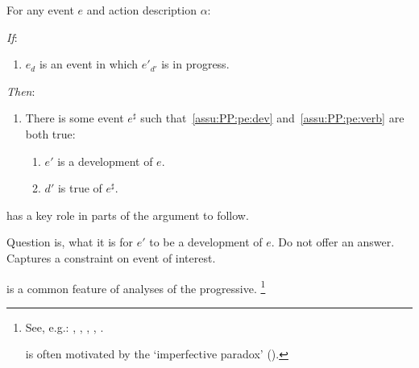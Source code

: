 \begin{note}
  \begin{assumption}[\assuPP{2}]%
    \label{assu:PP}%
    For any event \(e\) and action description \(\alpha\):
    \begin{itenum}
    \item[\emph{If}:]
      \begin{enumerate}[label=\alph*., ref=(\alph*)]
      \item
        \(e_{d}\) is an event in which \(e'_{d'}\) is in progress.
      \end{enumerate}
    \item[\emph{Then}:]
      \begin{enumerate}[label=\alph*., ref=(\alph*), resume]
      \item
        There is some  event \(e^{\sharp}\) such that~\ref{assu:PP:pe:dev} and~\ref{assu:PP:pe:verb} are both true:
        \begin{enumerate}[label=\roman*., ref=(\roman*)]
        \item
          \label{assu:PP:pe:dev}
          \(e'\) is a development of \(e\).
        \item
          \label{assu:PP:pe:verb}
          \(d'\) is true of \(e^{\sharp}\).
        \end{enumerate}
      \end{enumerate}
    \end{itenum}
    \vspace{-\baselineskip}
  \end{assumption}

  \assuPP{} has a key role in parts of the argument to follow.

  Question is, what it is for \(e'\) to be a development of \(e\).
  Do not offer an answer.
  Captures a constraint on  event of interest.


   is a common feature of analyses of the progressive.%
  \footnote{
    See, e.g.:
    \cite{Bennett:1972uw},
    \cite{Dowty:1979vq},
    \cite{Parsons:1990aa},
    \cite{Landman:1992wh},
    \cite{Portner:1998um}.

    \assuPP{} is often motivated by the `imperfective paradox' (\cite[cf.][Ch.3.1]{Dowty:1979vq}).

}
\end{note}
